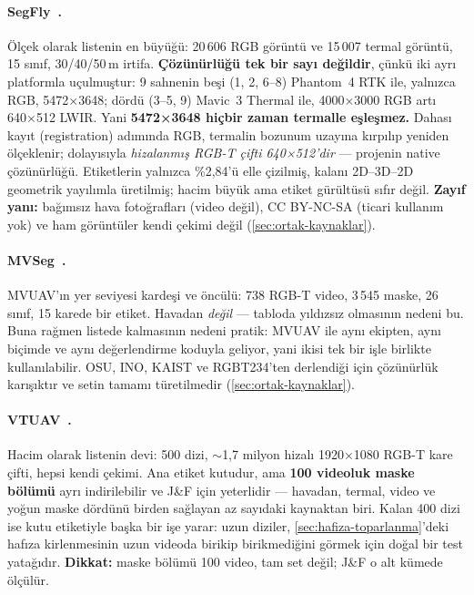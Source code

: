 \paragraph{SegFly~\cite{segfly2026}.}
Ölçek olarak listenin en büyüğü: 20\,606 RGB görüntü ve 15\,007 termal
görüntü, 15 sınıf, 30/40/50\,m irtifa. \textbf{Çözünürlüğü tek bir
sayı değildir}, çünkü iki ayrı platformla uçulmuştur: 9 sahnenin beşi
(1, 2, 6--8) Phantom~4 RTK ile, yalnızca RGB, 5472×3648; dördü (3--5, 9)
Mavic~3 Thermal ile, 4000×3000 RGB artı 640×512 LWIR. Yani
\textbf{5472×3648 hiçbir zaman termalle eşleşmez.} Dahası kayıt
(registration) adımında RGB, termalin bozunum uzayına kırpılıp yeniden
ölçeklenir; dolayısıyla \emph{hizalanmış RGB-T çifti 640×512'dir} ---
projenin native çözünürlüğü. Etiketlerin yalnızca \%2,84'ü elle
çizilmiş, kalanı 2D--3D--2D geometrik yayılımla üretilmiş; hacim büyük
ama etiket gürültüsü sıfır değil. \textbf{Zayıf yanı:} bağımsız hava
fotoğrafları (video değil), CC BY-NC-SA (ticari kullanım yok) ve ham
görüntüler kendi çekimi değil (\cref{sec:ortak-kaynaklar}).

\paragraph{MVSeg~\cite{ji2023mvseg}.}
MVUAV'ın yer seviyesi kardeşi ve öncülü: 738 RGB-T video, 3\,545 maske,
26 sınıf, 15 karede bir etiket. Havadan \emph{değil} --- tabloda yıldızsız
olmasının nedeni bu. Buna rağmen listede kalmasının nedeni pratik: MVUAV
ile aynı ekipten, aynı biçimde ve aynı değerlendirme koduyla geliyor, yani
ikisi tek bir işle birlikte kullanılabilir. OSU, INO, KAIST ve RGBT234'ten
derlendiği için çözünürlük karışıktır ve setin tamamı
türetilmedir (\cref{sec:ortak-kaynaklar}).

\paragraph{VTUAV~\cite{zhang2022vtuav}.}
Hacim olarak listenin devi: 500 dizi, $\sim$1,7 milyon hizalı 1920×1080
RGB-T kare çifti, hepsi kendi çekimi. Ana etiket kutudur, ama
\textbf{100 videoluk maske bölümü} ayrı indirilebilir ve J\&F için
yeterlidir --- havadan, termal, video ve yoğun maske dördünü birden
sağlayan az sayıdaki kaynaktan biri. Kalan 400 dizi ise kutu etiketiyle
başka bir işe yarar: uzun diziler,
\cref{sec:hafiza-toparlanma}'deki hafıza kirlenmesinin uzun videoda
birikip birikmediğini görmek için doğal bir test yatağıdır.
\textbf{Dikkat:} maske bölümü 100 video, tam set değil; J\&F o alt
kümede ölçülür.

